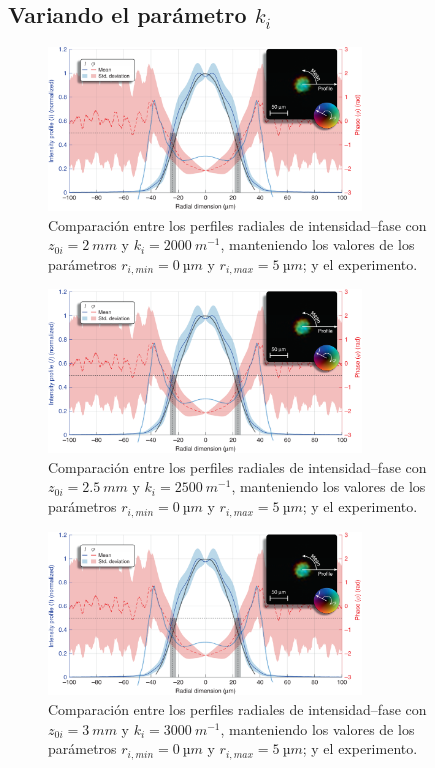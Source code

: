 \subsection*{Variando el parámetro $k_{i}$}

\begin{figure}[htbp]
  \centering
  \includegraphics[width=0.74\textwidth]{Figuras/anx_cmp_31.png}
  \caption*{Comparación entre los perfiles radiales de intensidad--fase con $z_{0i}=\qty{2}{mm}$ y $k_{i}=\qty{2000}{m^{-1}}$, manteniendo los valores de los parámetros $r_{i,min}=\qty{0}{µm}$ y $r_{i,max}=\qty{5}{µm}$; y el experimento.}
\end{figure}

\begin{figure}[htbp!]
  \centering
  \includegraphics[width=0.74\textwidth]{Figuras/anx_cmp_32.png}
  \caption*{Comparación entre los perfiles radiales de intensidad--fase con $z_{0i}=\qty{2.5}{mm}$ y $k_{i}=\qty{2500}{m^{-1}}$, manteniendo los valores de los parámetros $r_{i,min}=\qty{0}{µm}$ y $r_{i,max}=\qty{5}{µm}$; y el experimento.}
\end{figure}

\begin{figure}[htbp!]
  \centering
  \includegraphics[width=0.74\textwidth]{Figuras/anx_cmp_33.png}
  \caption*{Comparación entre los perfiles radiales de intensidad--fase con $z_{0i}=\qty{3}{mm}$ y $k_{i}=\qty{3000}{m^{-1}}$, manteniendo los valores de los parámetros $r_{i,min}=\qty{0}{µm}$ y $r_{i,max}=\qty{5}{µm}$; y el experimento.}
\end{figure}

